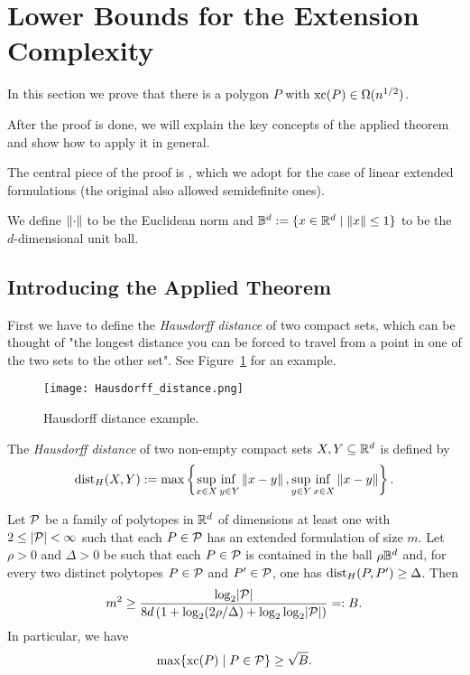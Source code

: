 \section{Lower Bounds for the Extension Complexity}

In this section we prove that there is a polygon $P$ with $\xc(P) \in \Omega(n^{1/2})$.

After the proof is done, we will explain the key concepts of the applied theorem and show how to apply it in general.

The central piece of the proof is \cite[Theorem~1]{averkov2016maximum}, which we adopt for the case of linear extended formulations (the original also allowed semidefinite ones).

We define $\norm{\cdot}$ to be the Euclidean norm and $\B^d := \{ x \in \R^d \mid \norm{x} \leq 1 \}$ to be the $d$-dimensional unit ball.



\subsection{Introducing the Applied Theorem}

First we have to define the \emph{Hausdorff distance} of two compact sets, which can be thought of "the longest distance you can be forced to travel from a point in one of the two sets to the other set". See Figure~\ref{fig:hausdorff} for an example.

\begin{figure}[h]
  \centering
  \texttt{[image: Hausdorff\_distance.png]}
  \caption{Hausdorff distance example. \cite{rocchini2007hausdorff}}
  \label{fig:hausdorff}
\end{figure}

\begin{definition}
  The \emph{Hausdorff distance} of two non-empty compact sets $X, Y \subseteq \R^d$ is defined by $$ \dist_H(X,Y) := \max \left\{ \adjustlimits \sup_{x \in X} \inf_{y \in Y} \norm{x-y}, \adjustlimits \sup_{y \in Y} \inf_{x \in X} \norm{x-y} \right\} .$$
\end{definition}

\begin{theorem}\label{theorem:family}
  Let $\P$ be a family of polytopes in $\R^d$ of dimensions at least one with $2 \leq \abs{\P} < \infty $ such that each $P \in \P$ has an extended formulation of size $m$.
  Let $\rho > 0$ and $\Delta > 0$ be such that each $P \in \P$ is contained in the ball $\rho \B^d$ and, 
  for every two distinct polytopes $P \in \P$ and $P' \in \P$, one has $\dist_H(P, P') \geq \Delta$. 
  Then $$m^2 \geq \frac{\log_2 \abs{\P}}{8d \left(1 + \log_2 (2\rho/\Delta) + \log_2\log_2 \abs{\P} \right)} =: B.$$
  In particular, we have $$\max \{\xc(P) \mid P \in \P\}  \geq \sqrt{B} .$$
\end{theorem}



